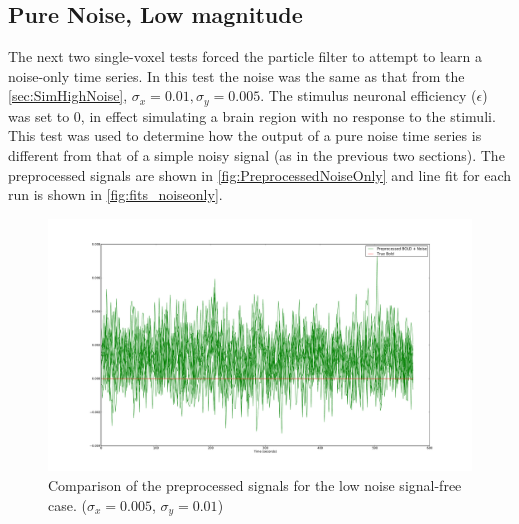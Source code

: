 \subsection{Pure Noise, Low magnitude}
\label{sec:PureNoiseLowMag}
The next two single-voxel tests forced the particle filter to attempt to learn a noise-only
time series. In this test the noise was the same as that from the \autoref{sec:SimHighNoise},
$\sigma_x = 0.01, \sigma_y = 0.005$. The stimulus neuronal efficiency ($\epsilon$) was set
to 0, in effect simulating a brain region with no response to the stimuli.
This test was used to determine how the output of a pure noise time series
is different from that of a simple noisy signal (as in the previous two sections).
The preprocessed signals are shown in \autoref{fig:PreprocessedNoiseOnly}
and line fit for each run is shown in \autoref{fig:fits_noiseonly}.


\begin{figure}[H]
\centering
\includegraphics[clip=true,trim=6cm 2cm 6cm 3.5cm,width=15cm]{images/preprocessed_noiseonly}
\caption[Comparison of the preprocessed signals for the low noise signal-free case.
($\sigma_x = 0.005$, $\sigma_y = 0.01$)]
{Comparison of the preprocessed signals for the low noise signal-free case.
 ($\sigma_x = 0.005$, $\sigma_y = 0.01$)}
\label{fig:PreprocessedNoiseOnly}
\end{figure}

